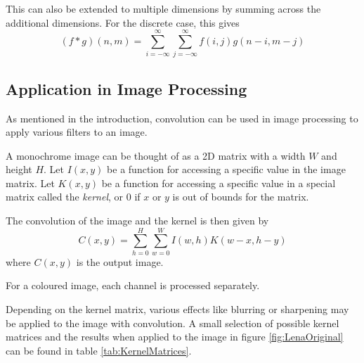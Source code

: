 This can also be extended to multiple dimensions by summing across the additional dimensions.
For the discrete case, this gives
\[
    (f * g)(n, m) = \sum^{\infty}_{i=-\infty}\sum^{\infty}_{j=-\infty}{f(i, j)g(n-i, m-j)}
\]

\subsection{Application in Image Processing}
As mentioned in the introduction, convolution can be used in image processing to apply various filters to an image.

A monochrome image can be thought of as a 2D matrix with a width $W$ and height $H$.
Let $I(x, y)$ be a function for accessing a specific value in the image matrix.
Let $K(x, y)$ be a function for accessing a specific value in a special matrix called the \textit{kernel},
or $0$ if $x$ or $y$ is out of bounds for the matrix.

The convolution of the image and the kernel is then given by
\[
    C(x, y) = \sum^{H}_{h=0} \sum^{W}_{w=0}{I(w, h)K(w - x, h -y)}
\]
where $C(x, y)$ is the output image.

For a coloured image, each channel is processed separately.

Depending on the kernel matrix, various effects like blurring or sharpening may be applied to the image with convolution.
A small selection of possible kernel matrices and the results when applied to the image in figure \ref{fig:LenaOriginal} can be found in table \ref{tab:KernelMatrices}.

